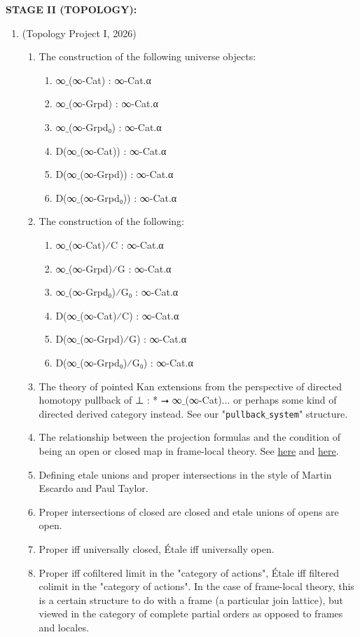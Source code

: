 \documentclass{book}
\begin{document}
{\bf STAGE II (TOPOLOGY):}
\begin{enumerate}
\item (Topology Project I, 2026)
\begin{enumerate}
\item The construction of the following universe objects:
\begin{enumerate}
\item ∞${}\_$(∞-Cat) : ∞-Cat.α
\item ∞${}\_$(∞-Grpd) : ∞-Cat.α
\item ∞${}\_$(∞-Grpd₀) : ∞-Cat.α
\item D(∞${}\_$(∞-Cat)) : ∞-Cat.α
\item D(∞${}\_$(∞-Grpd)) : ∞-Cat.α
\item D(∞${}\_$(∞-Grpd₀)) : ∞-Cat.α
\end{enumerate}
\item The construction of the following:
\begin{enumerate}
\item ∞${}\_$(∞-Cat)⁄C : ∞-Cat.α
\item ∞${}\_$(∞-Grpd)⁄G : ∞-Cat.α
\item ∞${}\_$(∞-Grpd₀)⁄G₀ : ∞-Cat.α
\item D(∞${}\_$(∞-Cat)⁄C) : ∞-Cat.α
\item D(∞${}\_$(∞-Grpd)⁄G) : ∞-Cat.α
\item D(∞${}\_$(∞-Grpd₀)⁄G₀) : ∞-Cat.α
\end{enumerate}
\item The theory of pointed Kan extensions from the perspective of directed homotopy pullback of ⊥ : * ⭢ ∞${}\_$(∞-Cat)... or perhaps some kind of directed derived category instead. See our "\texttt{pullback}$\_$\texttt{system}" structure.
\item The relationship between the projection formulas and the condition of being an open or closed map in frame-local theory. See \href{https://ncatlab.org/nlab/show/closed+morphism}{here} and \href{https://ncatlab.org/nlab/show/open+morphism}{here}.
\item Defining etale unions and proper intersections in the style of Martin Escardo and Paul Taylor.
\item Proper intersections of closed are closed and etale unions of opens are open.
\item Proper iff universally closed, Étale iff universally open.
\item Proper iff cofiltered limit in the "category of actions", Étale iff filtered colimit in the "category of actions". In the case of frame-local theory, this is a certain structure to do with a frame (a particular join lattice), but viewed in the category of complete partial orders as opposed to frames and locales.

\end{enumerate}
\end{enumerate}
\end{document}
